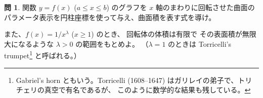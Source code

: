 \documentclass[a4paper]{jsarticle}
\theoremstyle{definition}
\newtheorem{Exercise}{問}%
\theoremstyle{remark}
\begin{document}






\begin{Exercise}
関数 $y = f(x)$ ($a \leq x \leq b$) のグラフを $x$ 軸のまわりに回転させた曲面の
パラメータ表示を円柱座標を使って与え、曲面積を表す式を導け。

また、$f(x) = 1/x^\lambda$ ($x \geq 1$) のとき、
回転体の体積は有限で その表面積が無限大になるような $\lambda > 0$ の範囲をもとめよ。
（$\lambda = 1$ のときは Torricelli's trumpet\footnote{Gabriel's horn ともいう。Torricelli (1608--1647) はガリレイの弟子で、トリチェリの真空で有名であるが、
  このように数学的な結果も残している。} と呼ばれる。）
\end{Exercise}
\end{document}
